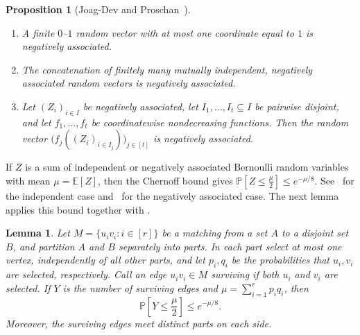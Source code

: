 \documentclass[11pt,a4paper]{article}
\newtheorem{lemma}[lemma]{Lemma}
\newtheorem{proposition}{Proposition}[section]
\theoremstyle{remark}
\numberwithin{equation}{section}
\newcommand{\Prob}{\mathbb{P}}
\newcommand{\E}{\mathbb{E}}
\begin{document}
	\begin{proposition}[Joag-Dev and Proschan~\cite{JDP}]
		\label{prop:negative-association}\leavevmode
		\begin{enumerate}
			\renewcommand{\labelenumi}{\textup{(\roman{enumi})}}
			\item A finite $0$--$1$ random vector with at most
			one coordinate equal to $1$ is negatively associated.
			
			\item The concatenation of finitely many mutually
			independent, negatively associated random vectors
			is negatively associated.
			
			\item Let $(Z_i)_{i\in I}$ be negatively associated,
			let $I_1,\ldots,I_t\subseteq I$ be pairwise disjoint,
			and let $f_1,\ldots,f_t$ be coordinatewise
			nondecreasing functions.
			Then the random vector
			$
			\bigl(f_j((Z_i)_{i\in I_j})\bigr)_{j\in[t]}
			$
			is negatively associated.
		\end{enumerate}
	\end{proposition}
	
	If $Z$ is a sum of independent or negatively associated
	Bernoulli random variables with mean $\mu=\E[Z]$, then
	the Chernoff bound gives
	$
	\Prob\!\left[Z\le\frac{\mu}{2}\right]\le e^{-\mu/8}.
	$
	See~\cite{AS} for the independent case and~\cite{DR}
	for the negatively associated case.
	The next lemma applies this bound together with
	.
	
	\begin{lemma}\label{lem:part-selection}
		Let $M=\{u_iv_i:i\in[r]\}$ be a matching from a set $A$
		to a disjoint set $B$, and partition $A$ and $B$
		separately into parts.
		In each part select at most one vertex, independently
		of all other parts, and let $p_i,q_i$ be the probabilities
		that $u_i,v_i$ are selected, respectively.
		Call an edge $u_iv_i\in M$ \emph{surviving} if both
		$u_i$ and $v_i$ are selected.
		If $Y$ is the number of surviving edges and
		$\mu=\sum_{i=1}^r p_iq_i$, then
		\[
		\Prob\!\left[Y\le\frac{\mu}{2}\right]\le e^{-\mu/8}.
		\]
		Moreover, the surviving edges meet distinct parts
		on each side.
	\end{lemma}
	
\end{document}
